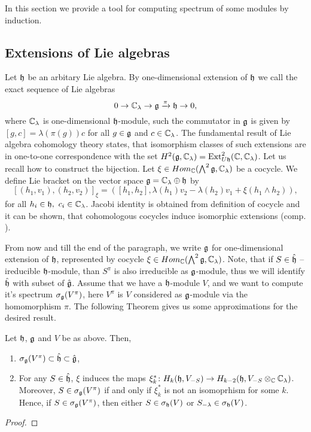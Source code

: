 In this section we provide a tool for computing spectrum of some modules by induction.

\subsection{Extensions of Lie algebras}
Let $\mathfrak{h}$ be an arbitary Lie algebra. By one-dimensional extension of $\mathfrak{h}$ we call the exact
sequence of Lie algebras
\[
    0 \to \mathbb{C}_\lambda\rightarrow \mathfrak{g} \xrightarrow\pi \mathfrak{h} \to 0,
\]
where $\mathbb{C}_\lambda$ is one-dimensional $\mathfrak{h}$-module, such the commutator in $\mathfrak{g}$ is given by
$[g,c] = \lambda(\pi(g))c$ for all $g \in \mathfrak{g}$ and $c \in \mathbb{C}_\lambda$.  The fundamental result of
Lie algebra cohomology theory states, that isomorphism classes of such extensions are in one-to-one
correspondence with the set $H^2(\mathfrak{g},\mathbb{C}_\lambda) = \operatorname{Ext}^2_{U\mathfrak{h}}(\mathbb{C}, \mathbb{C}_\lambda)$. Let
us recall how to construct the bijection. Let $\xi \in Hom_{\mathbb{C}}(\bigwedge^2\mathfrak{g}, \mathbb{C}_\lambda)$ be a
cocycle. We define Lie bracket on the vector space $\mathfrak{g} = \mathbb{C}_\lambda \oplus \mathfrak{h}$ by 
\[
    [(h_1, v_1), (h_2, v_2)]_\xi= ([h_1, h_2], \lambda(h_1) v_2 - \lambda(h_2) v_1 +
    \xi(h_1\wedge h_2)), 
\]
for all $h_i \in \mathfrak{h},~c_i\in \mathbb{C}_\lambda$. Jacobi identity is obtained from definition of cocycle
and it can be shown, that cohomologous cocycles induce isomorphic extensions (comp. ).

From now and till the end of the paragraph, we write $\mathfrak{g}$ for one-dimensional extension of
$\mathfrak{h}$, represented by cocycle $\xi \in Hom_{\mathbb{C}}(\bigwedge^2\mathfrak{g}, \mathbb{C}_\lambda)$. Note, that if $S \in
\hat{\mathfrak{h}}$ -- ireducible $\mathfrak{h}$-module, than $S^\pi$ is also irreducible as $\mathfrak{g}$-module, thus
we will identify $\hat{\mathfrak{h}}$ with subset of $\hat{\mathfrak{g}}$. Assume that we
have a $\mathfrak{h}$-module $V$, and we want to compute it's spectrum $\sigma_{\mathfrak{g}} (V^\pi)$, here
$V^\pi$ is $V$ considered as $\mathfrak{g}$-module via the homomorphism $\pi$. The following Theorem gives
us some approximations for the desired result.
\begin{theorem}
    Let $\mathfrak{h}$, $\mathfrak{g}$ and $V$ be as above. Then,
    \begin{enumerate}
        \item $\sigma_{\mathfrak{g}}(V^\pi) \subset \hat{\mathfrak{h}} \subset \hat{\mathfrak{g}}$,

        \item For any $S \in \hat{\mathfrak{h}}$, $\xi$ induces the maps $\xi_k^* \colon H_k(\mathfrak{h}, V_{-S})
            \to H_{k - 2}(\mathfrak{h},  V_{-S}\otimes_{\mathbb{C}} \mathbb{C}_\lambda)$. Moreover, $S \in
            \sigma_{\mathfrak{g}}(V^\pi)$ if and only if $\xi^*_k$ is not an isomoprhism for some $k$.
            Hence, if $S\in \sigma_{\mathfrak{g}}(V^\pi)$, then either $S \in \sigma_{\mathfrak{h}}(V)$ or
            $S_{-\lambda}\in \sigma_{\mathfrak{h}}(V)$.
    \end{enumerate}
\end{theorem}
\begin{proof}
    \todo{}
\end{proof}
